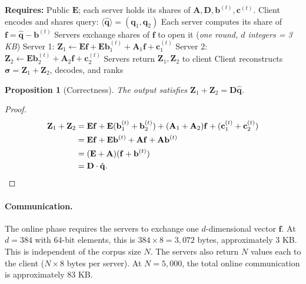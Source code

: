 \documentclass[11pt]{article}
\newtheorem{proposition}[theorem]{Proposition}
\begin{document}
\begin{algorithm}[t]
\caption{Mutual-Privacy Retrieval (Matrix-Vector Beaver)}
\label{alg:mutual-privacy}
\begin{algorithmic}[1]
\Statex \textbf{Requires:} Public $\mathbf{E}$; each server holds its shares of $\mathbf{A}, \mathbf{D}, \mathbf{b}^{(t)}, \mathbf{c}^{(t)}$.
\Statex
\State Client encodes and shares query: $\langle \hat{\mathbf{q}} \rangle = (\mathbf{q}_1, \mathbf{q}_2)$
\State Each server computes its share of $\mathbf{f} = \hat{\mathbf{q}} - \mathbf{b}^{(t)}$
\State Servers exchange shares of $\mathbf{f}$ to open it \hfill (\textit{one round, $d$ integers = 3 KB})
\State Server 1: $\mathbf{Z}_1 \leftarrow \mathbf{E}\mathbf{f} + \mathbf{E}\mathbf{b}_1^{(t)} + \mathbf{A}_1 \mathbf{f} + \mathbf{c}_1^{(t)}$
\State Server 2: $\mathbf{Z}_2 \leftarrow \mathbf{E}\mathbf{b}_2^{(t)} + \mathbf{A}_2 \mathbf{f} + \mathbf{c}_2^{(t)}$
\State Servers return $\mathbf{Z}_1, \mathbf{Z}_2$ to client
\State Client reconstructs $\boldsymbol{\sigma} = \mathbf{Z}_1 + \mathbf{Z}_2$, decodes, and ranks
\end{algorithmic}
\end{algorithm}

\begin{proposition}[Correctness]
\label{prop:beaver-correct}
The output satisfies $\mathbf{Z}_1 + \mathbf{Z}_2 = \mathbf{D}\hat{\mathbf{q}}$.
\end{proposition}

\begin{proof}
\begin{align*}
\mathbf{Z}_1 + \mathbf{Z}_2 &= \mathbf{E}\mathbf{f} + \mathbf{E}(\mathbf{b}_1^{(t)} + \mathbf{b}_2^{(t)}) + (\mathbf{A}_1 + \mathbf{A}_2)\mathbf{f} + (\mathbf{c}_1^{(t)} + \mathbf{c}_2^{(t)}) \\
&= \mathbf{E}\mathbf{f} + \mathbf{E}\mathbf{b}^{(t)} + \mathbf{A}\mathbf{f} + \mathbf{A}\mathbf{b}^{(t)} \\
&= (\mathbf{E} + \mathbf{A})(\mathbf{f} + \mathbf{b}^{(t)}) \\
&= \mathbf{D} \cdot \hat{\mathbf{q}}. \qedhere
\end{align*}
\end{proof}

\paragraph{Communication.} The online phase requires the servers to exchange one $d$-dimensional vector $\mathbf{f}$. At $d = 384$ with 64-bit elements, this is $384 \times 8 = 3{,}072$ bytes, approximately 3 KB. This is independent of the corpus size $N$. The servers also return $N$ values each to the client ($N \times 8$ bytes per server). At $N = 5{,}000$, the total online communication is approximately 83 KB.
\end{document}
